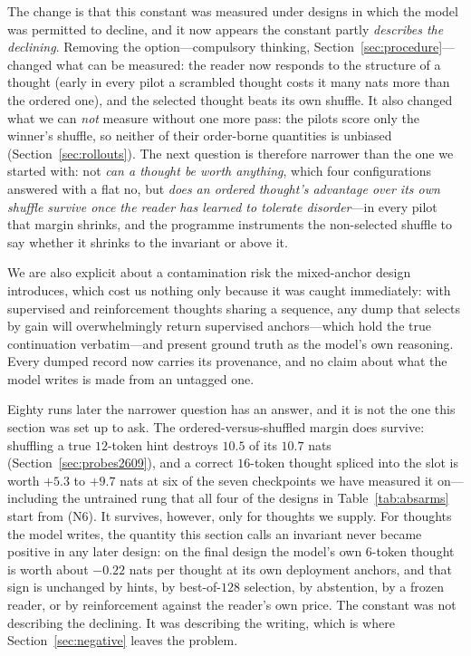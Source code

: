 \documentclass{article} %
\begin{document}
The change is that this constant was measured under designs in which the model was permitted to decline, and it now appears the constant partly \emph{describes the declining}. Removing the option---compulsory thinking, Section~\ref{sec:procedure}---changed what can be measured: the reader now responds to the structure of a thought (early in every pilot a scrambled thought costs it many nats more than the ordered one), and the selected thought beats its own shuffle. It also changed what we can \emph{not} measure without one more pass: the pilots score only the winner's shuffle, so neither of their order-borne quantities is unbiased (Section~\ref{sec:rollouts}). The next question is therefore narrower than the one we started with: not \emph{can a thought be worth anything}, which four configurations answered with a flat no, but \emph{does an ordered thought's advantage over its own shuffle survive once the reader has learned to tolerate disorder}---in every pilot that margin shrinks, and the programme instruments the non-selected shuffle to say whether it shrinks to the invariant or above it.

We are also explicit about a contamination risk the mixed-anchor design introduces, which cost us nothing only because it was caught immediately: with supervised and reinforcement thoughts sharing a sequence, any dump that selects by gain will overwhelmingly return supervised anchors---which hold the true continuation verbatim---and present ground truth as the model's own reasoning. Every dumped record now carries its provenance, and no claim about what the model writes is made from an untagged one.

Eighty runs later the narrower question has an answer, and it is not the one this section was set up to ask. The ordered-versus-shuffled margin does survive: shuffling a true $12$-token hint destroys $10.5$ of its $10.7$ nats (Section~\ref{sec:probes2609}), and a correct $16$-token thought spliced into the slot is worth $+5.3$ to $+9.7$ nats at six of the seven checkpoints we have measured it on---including the untrained rung that all four of the designs in Table~\ref{tab:absarms} start from (N6). It survives, however, only for thoughts we supply. For thoughts the model writes, the quantity this section calls an invariant never became positive in any later design: on the final design the model's own $6$-token thought is worth about $-0.22$ nats per thought at its own deployment anchors, and that sign is unchanged by hints, by best-of-$128$ selection, by abstention, by a frozen reader, or by reinforcement against the reader's own price. The constant was not describing the declining. It was describing the writing, which is where Section~\ref{sec:negative} leaves the problem.
\end{document}
